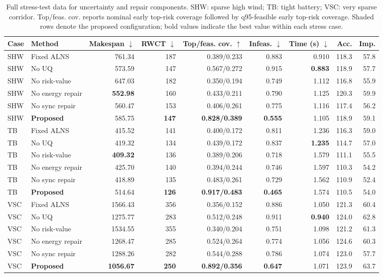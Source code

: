 \begin{table}[H]
\centering
\caption{Full stress-test data for uncertainty and repair components. SHW: sparse high wind; TB: tight battery; VSC: very sparse corridor. Top/feas. cov. reports nominal early top-risk coverage followed by q95-feasible early top-risk coverage. Shaded rows denote the proposed configuration; bold values indicate the best value within each stress case.}
\label{tab:stress-results}
\small
\setlength{\tabcolsep}{2.7pt}
\begin{tabular}{@{}llrrrrrrr@{}}
\toprule
Case & Method & Makespan $\downarrow$ & RWCT $\downarrow$ & Top/feas. cov. $\uparrow$ & Infeas. $\downarrow$ & Time (s) $\downarrow$ & Acc. & Imp. \\
\midrule
SHW & Fixed ALNS & 761.34 & 187 & 0.389/0.233 & 0.883 & 0.910 & 118.3 & 57.8 \\
SHW & No UQ & 573.59 & 147 & 0.567/0.272 & 0.915 & \textbf{0.883} & 118.9 & 57.7 \\
SHW & No risk-value & 647.03 & 182 & 0.350/0.194 & 0.749 & 1.112 & 116.8 & 55.9 \\
SHW & No energy repair & \textbf{552.98} & 160 & 0.433/0.211 & 0.790 & 1.125 & 120.3 & 59.9 \\
SHW & No sync repair & 560.47 & 153 & 0.406/0.261 & 0.775 & 1.116 & 117.4 & 56.2 \\
\rowcolor{gray!10}
SHW & \textbf{Proposed} & 585.75 & \textbf{147} & \textbf{0.828/0.389} & \textbf{0.555} & 1.105 & 118.9 & 59.1 \\
\addlinespace[2pt]
TB & Fixed ALNS & 415.52 & 141 & 0.400/0.172 & 0.811 & 1.236 & 116.3 & 59.0 \\
TB & No UQ & 419.32 & 134 & 0.439/0.172 & 0.837 & \textbf{1.235} & 114.7 & 57.0 \\
TB & No risk-value & \textbf{409.32} & 136 & 0.389/0.206 & 0.718 & 1.579 & 111.1 & 55.5 \\
TB & No energy repair & 425.70 & 140 & 0.394/0.244 & 0.746 & 1.597 & 110.3 & 54.2 \\
TB & No sync repair & 418.89 & 135 & 0.483/0.261 & 0.729 & 1.562 & 110.9 & 52.4 \\
\rowcolor{gray!10}
TB & \textbf{Proposed} & 514.64 & \textbf{126} & \textbf{0.917/0.483} & \textbf{0.465} & 1.574 & 110.5 & 54.0 \\
\addlinespace[2pt]
VSC & Fixed ALNS & 1566.43 & 356 & 0.356/0.152 & 0.886 & 1.050 & 121.3 & 60.4 \\
VSC & No UQ & 1275.77 & 283 & 0.512/0.248 & 0.911 & \textbf{0.940} & 124.0 & 62.8 \\
VSC & No risk-value & 1534.55 & 355 & 0.340/0.204 & 0.751 & 1.098 & 121.2 & 61.3 \\
VSC & No energy repair & 1268.47 & 285 & 0.524/0.264 & 0.774 & 1.056 & 124.6 & 60.3 \\
VSC & No sync repair & 1288.26 & 282 & 0.544/0.288 & 0.786 & 1.074 & 123.0 & 57.7 \\
\rowcolor{gray!10}
VSC & \textbf{Proposed} & \textbf{1056.67} & \textbf{250} & \textbf{0.892/0.356} & \textbf{0.647} & 1.071 & 123.9 & 63.7 \\
\bottomrule
\end{tabular}
\end{table}
